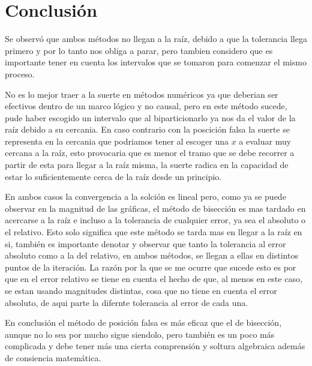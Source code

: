 \documentclass{article}
\begin{document}
\section{Conclusión}
Se observó que ambos métodos no llegan a la raíz, debido a que la tolerancia llega primero y por lo tanto nos obliga a parar, pero tambien considero que es importante tener en cuenta los intervalos que se tomaron para comenzar el mismo proceso.

No es lo mejor traer a la suerte en métodos numéricos ya que deberian ser efectivos dentro de un marco lógico y no causal, pero en este método sucede, pude haber escogido un intervalo que al biparticionarlo ya nos da el valor de la raíz debido a su cercania. En caso contrario con la poscición falsa la suerte se representa en la cercania que podriamos tener al escoger una $x$ a evaluar muy cercana a la raíz, esto provocaria que es menor el tramo que se debe recorrer a partir de esta para llegar a la raíz misma, la suerte radica en la capacidad de estar lo suficientemente cerca de la raíz desde un principio. 

En ambos casos la convergencia a la solción es lineal pero, como ya se puede observar en la magnitud de las gráficas, el método de bisección es mas tardado en acercarse a la raíz e incluso a la tolerancia de cualquier error, ya sea el absoluto o el relativo. Esto solo significa que este método se tarda mas en llegar a la raíz en si, también es importante denotar y observar que tanto la tolerancia al error absoluto como a la del relativo, en ambos métodos, se llegan a ellas en distintos puntos de la iteración. La razón por la que se me ocurre que sucede esto es por que en el error relativo se tiene en cuenta el hecho de que, al menos en este caso, se estan usando magnitudes distintas, cosa que no tiene en cuenta el error absoluto, de aqui parte la difernte tolerancia al error de cada una.

En conclusión el método de posición falsa es más eficaz que el de bisección, aunque no lo sea por mucho sigue siendolo, pero también es un poco más complicada y debe tener más una cierta comprensión y soltura algebraica además de consiencia matemática.
\end{document}
